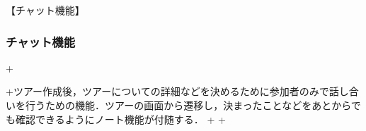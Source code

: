 【チャット機能】
\par
\subsubsection{チャット機能}
+\par
+ツアー作成後，ツアーについての詳細などを決めるために参加者のみで話し合いを行うための機能．ツアーの画面から遷移し，決まったことなどをあとからでも確認できるようにノート機能が付随する．
+
+
